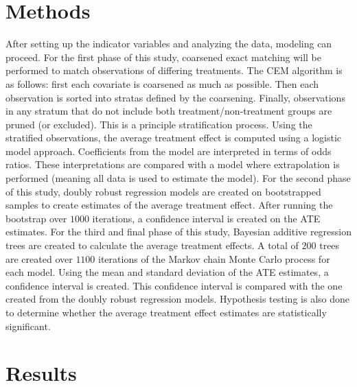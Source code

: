 \documentclass[a4paper, 10pt, conference]{ieeeconf}
\begin{document}
\section{Methods} 
\parindent 10pt After setting up the indicator variables and analyzing the data, modeling can proceed. For the first phase of this study, coarsened exact matching will be performed to match observations of differing treatments. The CEM algorithm is as follows: first each covariate is coarsened as much as possible. Then each observation is sorted into stratas defined by the coarsening. Finally, observations in any stratum that do not include both treatment/non-treatment groups are pruned (or excluded). This is a principle stratification process. Using the stratified observations, the average treatment effect is computed using a logistic model approach. Coefficients from the model are interpreted in terms of odds ratios. These interpretations are compared with a model where extrapolation is performed (meaning all data is used to estimate the model). For the second phase of this study, doubly robust regression models are created on bootstrapped samples to create estimates of the average treatment effect. After running the bootstrap over $1000$ iterations, a confidence interval is created on the ATE estimates. For the third and final phase of this study, Bayesian additive regression trees are created to calculate the average treatment effects. A total of $200$ trees are created over $1100$ iterations of the Markov chain Monte Carlo process for each model. Using the mean and standard deviation of the ATE estimates, a confidence interval is created. This confidence interval is compared with the one created from the doubly robust regression models. Hypothesis testing is also done to determine whether the average treatment effect estimates are statistically significant.

\section{Results}
\end{document}
